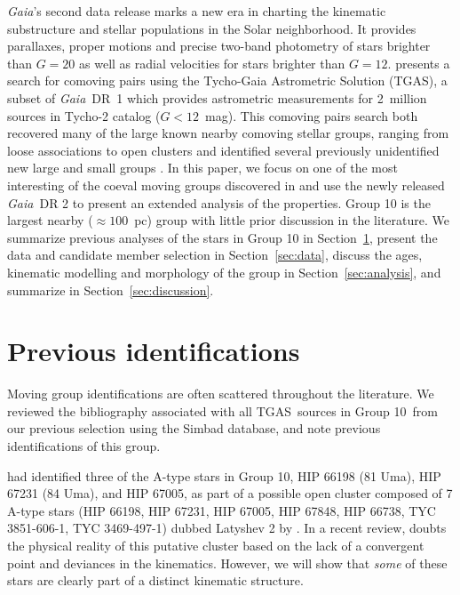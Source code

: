 \documentclass[modern,letterpaper]{aastex61}
\newcommand{\project}[1]{\textsl{#1}}
\newcommand{\acronym}[1]{{\small{#1}}}
\newcommand{\gaia}{\project{Gaia}}
\newcommand{\sectionname}{Section}
\newcommand{\tgas}{\acronym{TGAS}}
\newcommand{\groupTen}{Group 10}
\begin{document}
\gaia's second  data release \citep[][DR 2]{2018arXiv180409365G} marks a new
era in charting the kinematic substructure and stellar populations in the Solar
neighborhood.
It provides parallaxes, proper motions and precise two-band photometry of stars
brighter than $G=20$ as well as radial velocities for stars brighter than
$G=12$.
\citet{2017AJ....153..257O} presents a search for comoving pairs using the
Tycho-Gaia Astrometric Solution (\tgas), a subset of \gaia\ DR~1 which provides
astrometric measurements for 2~million sources in Tycho-2 catalog ($G<12$~mag).
This comoving pairs search both recovered many of the large known nearby
comoving stellar groups, ranging from loose associations to open clusters and
identified several previously unidentified new large and small groups
\citep[see also][]{2018arXiv180409058F}.
In this paper, we focus on one of the most interesting of the coeval moving
groups discovered in \citet{2017AJ....153..257O} and use the newly released \gaia\
DR 2 to present an extended analysis of the properties.
Group 10 is the largest nearby ($\approx 100$~pc) group with little prior
discussion in the literature.
We summarize previous analyses of the stars in Group 10 in \sectionname~\ref{sec:history},
present the data and candidate member selection in \sectionname~\ref{sec:data},
discuss the ages, kinematic modelling and morphology of the group in \sectionname~\ref{sec:analysis},
and summarize in \sectionname~\ref{sec:discussion}.

\section{Previous identifications}
\label{sec:history}

Moving group identifications are often scattered throughout the literature. We
reviewed the bibliography associated with all \tgas\ sources in
\groupTen\ from our previous selection \citep{2017AJ....153..257O} using the
Simbad database, and note previous identifications of this group.

\citet{1977ATsir.969....7L} had identified three of the A-type stars in \groupTen,
HIP 66198 (81 Uma), HIP 67231 (84 Uma), and HIP 67005, as part of
a possible open cluster composed of 7 A-type stars
(HIP 66198,
HIP 67231,
HIP 67005,
HIP 67848,
HIP 66738,
TYC 3851-606-1,
TYC 3469-497-1)
dubbed Latyshev 2 by \citet{2003stcl.book.....A}.
In a recent review, \citet{2016IAUS..314...21M} doubts the physical reality of
this putative cluster based on the lack of a convergent point and deviances in
the kinematics.
However, we will show that \emph{some} of these stars are clearly part of a distinct
kinematic structure.
\end{document}
